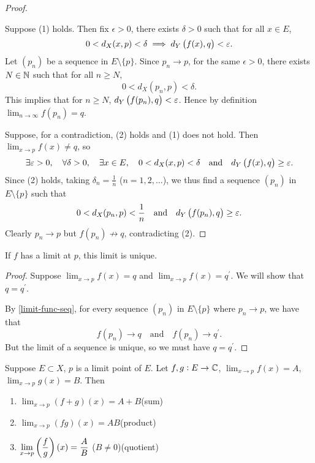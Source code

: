 \begin{proof} \

\fbox{$\implies$} Suppose (1) holds. Then fix $\epsilon>0$, there exists $\delta>0$ such that for all $x\in E$,
\[0<d_X(x,p)<\delta\implies d_Y\left(f(x),q\right)<\varepsilon.\]
Let $(p_n)$ be a sequence in $E\setminus\{p\}$. Since $p_n\to p$, for the same $\epsilon>0$, there exists $N\in\mathbb N$ such that for all $n\ge N$,
\[0<d_X(p_n,p)<\delta.\]
This implies that for $n\ge N$, $d_Y\left(f(p_n),q\right)<\varepsilon$. Hence by definition $\displaystyle\lim_{n\to\infty}f(p_n)=q$.

\fbox{$\impliedby$} Suppose, for a contradiction, (2) holds and (1) does not hold. Then $\displaystyle\lim_{x\to p}f(x)\neq q$, so
\[\exists\varepsilon>0,\quad\forall\delta>0,\quad\exists x\in E,\quad 0<d_X(x,p)<\delta\quad\text{and}\quad d_Y\left(f(x),q\right)\ge\varepsilon.\]
Since (2) holds, taking $\delta_n=\frac{1}{n}$ ($n=1,2,\dots$), we thus find a sequence $(p_n)$ in $E\setminus\{p\}$ such that
\[0<d_X(p_n,p)<\frac{1}{n}\quad\text{and}\quad d_Y\left(f(p_n),q\right)\ge\varepsilon.\]
Clearly $p_n\to p$ but $f(p_n)\not\to q$, contradicting (2).
\end{proof}

\begin{corollary}
If $f$ has a limit at $p$, this limit is unique.
\end{corollary}

\begin{proof}
Suppose $\displaystyle\lim_{x\to p}f(x)=q$ and $\displaystyle\lim_{x\to p}f(x)=q^\prime$. We will show that $q=q^\prime$.

By \cref{limit-func-seq}, for every sequence $(p_n)$ in $E\setminus\{p\}$ where $p_n\to p$, we have that
\[f(p_n)\to q\quad\text{and}\quad f(p_n)\to q^\prime.\]
But the limit of a sequence is unique, so we must have $q=q^\prime$.
\end{proof}

\begin{lemma}
Suppose $E\subset X$, $p$ is a limit point of $E$. Let $f,g:E\to\mathbb C$, $\displaystyle\lim_{x\to p}f(x)=A$, $\displaystyle\lim_{x\to p}g(x)=B$. Then
\begin{enumerate}[label=(\roman*)]
\item $\displaystyle\lim_{x\to p}(f+g)(x)=A+B$\hfill(sum)
\item $\displaystyle\lim_{x\to p}(fg)(x)=AB$\hfill(product)
\item $\displaystyle\lim_{x\to p}\left(\frac{f}{g}\right)(x)=\frac{A}{B}$ ($B\neq0$)\hfill(quotient)
\end{enumerate}
\end{lemma}

